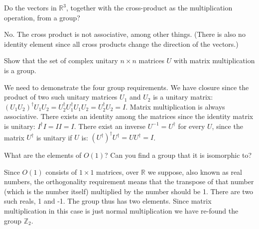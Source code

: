 \documentclass[notes.tex]{subfiles}
\begin{document}
\begin{Exercise}[difficulty=0]
Do the vectors in $\mathbb R^3$, together with the cross-product as the multiplication operation, from a group?
\end{Exercise}
\begin{Answer}
No. The cross product is not associative, among other things. (There is also no identity element since all cross products change the direction of the vectors.)
\end{Answer}

\begin{Exercise}[difficulty=1]
Show that the set of complex unitary $n\times n$ matrices $U$ with matrix multiplication is a group.
\end{Exercise}
\begin{Answer}
We need to demonstrate the four group requirements. We have closure since the product of two such unitary matrices $U_1$ and $U_2$ is a unitary matrix: $(U_1U_2)^\dagger U_1U_2= U_2^\dagger U_1^\dagger U_1U_2= U_2^\dagger U_2=I$. Matrix multiplication is always associative. There exists an identity among the matrices since the identity matrix is unitary: $I^\dagger I = II=I$. There exist an inverse $U^{-1}=U^\dagger$ for every $U$, since the matrix $U^\dagger$ is unitary if $U$ is: $(U^\dagger)^\dagger U^\dagger= UU^\dagger=I$.
\end{Answer}

\begin{Exercise}[difficulty=1]
What are the elements of $O(1)$? Can you find a group that it is isomorphic to?
\end{Exercise}
\begin{Answer}
Since $O(1)$ consists of $1\times1$ matrices, over $\mathbb R$ we suppose, also known as real numbers, the orthogonality requirement means that the transpose of that number (which is the number itself) multiplied by the number should be 1. There are two such reals, 1 and -1. The group thus has two elements. Since matrix multiplication in this case is just normal multiplication we have re-found the group $\mathbb Z_2$.
\end{Answer}
\end{document}

